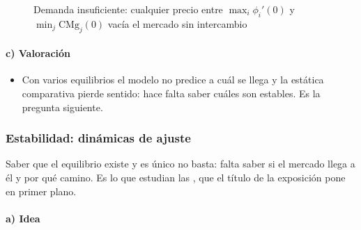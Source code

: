 \documentclass[11pt]{article}
\begin{document}
\begin{figure}[H]
\centering
\caption{Demanda insuficiente: cualquier precio entre $\max_i\phi_i'(0)$ y $\min_j\mathrm{CMg}_j(0)$ vacía el mercado sin intercambio}\label{fig:multiplicidad}
\end{figure}

\paragraph{c) Valoración}

\begin{itemize}
\item Con varios equilibrios el modelo no predice a cuál se llega y la estática comparativa pierde sentido: hace falta saber cuáles son estables. Es la pregunta siguiente.
\end{itemize}

\subsubsection{Estabilidad: dinámicas de ajuste}\label{sec:estabilidad-dinamicas-ajuste}

Saber que el equilibrio existe y es único no basta: falta saber si el mercado llega a él y por qué camino. Es lo que estudian las , que el título de la exposición pone en primer plano.

\paragraph{a) Idea}
\end{document}
